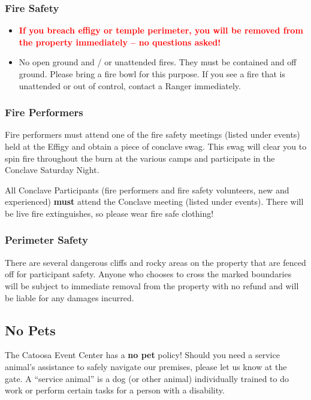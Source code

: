 \subsubsection*{Fire Safety}
\label{sub:fire-safety}

\begin{itemize}[noitemsep]
\item \textbf{\textcolor{red}{If you breach effigy or temple perimeter, you will be removed from the property immediately -- no questions asked!}} 
\item No open ground and / or unattended fires. They must be contained and off ground. Please bring a fire bowl for this purpose. If you see a fire that is unattended or out of control, contact a Ranger immediately.
\end{itemize}

\subsubsection*{Fire Performers}
Fire performers must attend one of the fire safety meetings (listed under events) held at the Effigy and obtain a piece of conclave swag. This swag will clear you to spin fire throughout the burn at the various camps and participate in the Conclave Saturday Night.

All Conclave Participants (fire performers and fire safety volunteers, new and experienced) \textbf{must} attend the Conclave meeting (listed under events). There will be live fire extinguishes, so please wear fire safe clothing!


\subsubsection{Perimeter Safety}
\label{sub:grounds-safety}

There are several dangerous cliffs and rocky areas on the property that are fenced off for participant safety. Anyone who chooses to cross the marked boundaries will be subject to immediate removal from the property with no refund and will be liable for any damages incurred. 


\subsection*{No Pets}
\label{sub:nopets}

The Catoosa Event Center has a \textbf{no pet} policy!
%
Should you need a service animal’s assistance to safely navigate our premises, please let us know at the gate.  A ``service animal'' is a dog (or other animal) individually trained to do work or perform certain tasks for a person with a disability.


